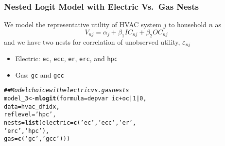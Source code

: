 \documentclass{beamer}\usepackage[]{graphicx}\usepackage[]{color}
\makeatletter
\newcommand{\hlnum}[1]{\textcolor[rgb]{0.686,0.059,0.569}{#1}}%
\newcommand{\hlstr}[1]{\textcolor[rgb]{0.192,0.494,0.8}{#1}}%
\newcommand{\hlcom}[1]{\textcolor[rgb]{0.678,0.584,0.686}{\textit{#1}}}%
\newcommand{\hlopt}[1]{\textcolor[rgb]{0,0,0}{#1}}%
\newcommand{\hlstd}[1]{\textcolor[rgb]{0.345,0.345,0.345}{#1}}%
\newcommand{\hlkwb}[1]{\textcolor[rgb]{0.69,0.353,0.396}{#1}}%
\newcommand{\hlkwc}[1]{\textcolor[rgb]{0.333,0.667,0.333}{#1}}%
\newcommand{\hlkwd}[1]{\textcolor[rgb]{0.737,0.353,0.396}{\textbf{#1}}}%
\newenvironment{kframe}{%
 \def\at@end@of@kframe{}%
 \ifinner\ifhmode%
  \def\at@end@of@kframe{\end{minipage}}%
  \begin{minipage}{\columnwidth}%
 \fi\fi%
 \def\FrameCommand##1{\hskip\@totalleftmargin \hskip-\fboxsep
 \colorbox{shadecolor}{##1}\hskip-\fboxsep
     \hskip-\linewidth \hskip-\@totalleftmargin \hskip\columnwidth}%
 \MakeFramed {\advance\hsize-\width
   \@totalleftmargin\z@ \linewidth\hsize
   \@setminipage}}%
 {\par\unskip\endMakeFramed%
 \at@end@of@kframe}
\newenvironment{knitrout}{}{} %
\makeatother
\begin{document}
\begin{frame}[fragile]\frametitle{Nested Logit Model with Electric Vs.\ Gas Nests}
    We model the representative utility of HVAC system $j$ to household $n$ as
    $$V_{nj} = \alpha_j + \beta_1 IC_{nj} + \beta_2 OC_{nj}$$
    and we have two nests for correlation of unobserved utility, $\varepsilon_{nj}$
    \begin{itemize}
    	\item Electric: \texttt{ec}, \texttt{ecc}, \texttt{er}, \texttt{erc}, and \texttt{hpc}
    	\item Gas: \texttt{gc} and \texttt{gcc}
    \end{itemize}
\begin{knitrout}\footnotesize
{}\color{fgcolor}\begin{kframe}
\begin{alltt}
\hlcom{## Model choice with electric vs. gas nests}
\hlstd{model_3} \hlkwb{<-} \hlkwd{mlogit}\hlstd{(}\hlkwc{formula} \hlstd{= depvar} \hlopt{~} \hlstd{ic} \hlopt{+} \hlstd{oc} \hlopt{|} \hlnum{1} \hlopt{|} \hlnum{0}\hlstd{,}
                  \hlkwc{data} \hlstd{= hvac_dfidx,}
                  \hlkwc{reflevel} \hlstd{=} \hlstr{'hpc'}\hlstd{,}
                  \hlkwc{nests} \hlstd{=} \hlkwd{list}\hlstd{(}\hlkwc{electric} \hlstd{=} \hlkwd{c}\hlstd{(}\hlstr{'ec'}\hlstd{,} \hlstr{'ecc'}\hlstd{,} \hlstr{'er'}\hlstd{,}
                                            \hlstr{'erc'}\hlstd{,} \hlstr{'hpc'}\hlstd{),}
                               \hlkwc{gas} \hlstd{=} \hlkwd{c}\hlstd{(}\hlstr{'gc'}\hlstd{,} \hlstr{'gcc'}\hlstd{)))}
\end{alltt}
\end{kframe}
\end{knitrout}
\end{frame}
\end{document}
